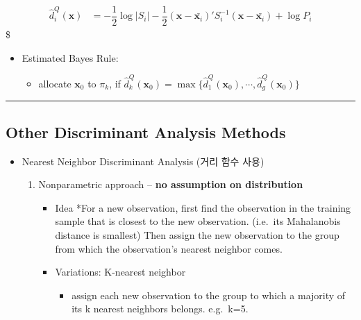 \documentclass[
]{book}
\providecommand{\tightlist}{%
  \setlength{\itemsep}{0pt}\setlength{\parskip}{0pt}}
\begin{document}
{{{\begin{align*}
\hat {d}_i^Q (\pmb x) &= -\dfrac{1}{2} \log\vert S_i \vert -\dfrac{1}{2} (\pmb x - \bar {\pmb x_i})' S_i^{-1} (\pmb x - \bar {\pmb x_i}) +\log P_i \tag{Sample}

\end{align*}
\$

\begin{itemize}
\tightlist
\item
  Estimated Bayes Rule:

  \begin{itemize}
  \tightlist
  \item
    allocate \(\pmb x_0\) to \(\pi_k\), if \(\hat d_k^Q(\pmb x_0) = \max \{ \hat d_1^Q(\pmb x_0), \cdots, \hat d_g^Q(\pmb x_0) \}\)
  \end{itemize}
\end{itemize}

\begin{center}\rule{0.5\linewidth}{0.5pt}\end{center}

\hypertarget{other-discriminant-analysis-methods}{%
\subsection{Other Discriminant Analysis Methods}\label{other-discriminant-analysis-methods}}

\begin{itemize}
\tightlist
\item
  Nearest Neighbor Discriminant Analysis (거리 함수 사용)

  \begin{enumerate}
  \def\labelenumi{\arabic{enumi}.}
  \tightlist
  \item
    Nonparametric approach -- \textbf{no assumption on distribution}

    \begin{itemize}
    \tightlist
    \item
      Idea
      *For a new observation, first find the observation in the training sample that is closest to the new observation. (i.e.~its Mahalanobis distance is smallest) Then assign the new observation to the group from which the observation's nearest neighbor comes.
    \item
      Variations: K-nearest neighbor

      \begin{itemize}
      \tightlist
      \item
        assign each new observation to the group to which a majority of its k nearest neighbors belongs. e.g.~k=5.
      \end{itemize}
    \end{itemize}
  \end{enumerate}
\end{itemize}

}}}
\end{document}
